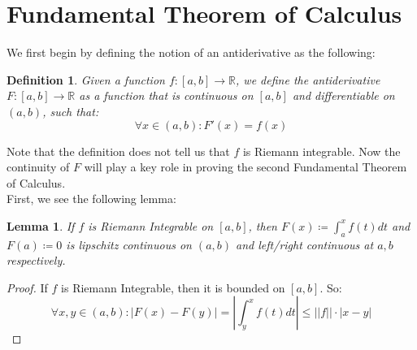 \documentclass[10pt,letterpaper]{article} %
\newtheorem{lem}{Lemma}[section]
\newtheorem{defn}{Definition}[section]
\begin{document}
\pagebreak
\section{Fundamental Theorem of Calculus}
We first begin by defining the notion of an antiderivative as the following:
\begin{defn}
Given a function $f: [a, b] \xrightarrow{} \mathbb{R}$, we define the antiderivative $F: [a, b] \xrightarrow{} \mathbb{R}$ as a function that is continuous on $[a, b]$ and differentiable on $(a, b)$, such that:
\begin{equation*}
  \forall x \in (a, b): F'(x) = f(x)
\end{equation*}
\end{defn}
Note that the definition does not tell us that $f$ is Riemann integrable. Now the continuity of $F$ will play a key role in proving the second Fundamental Theorem of Calculus.\\

First, we see the following lemma:
\begin{lem}
If $f$ is Riemann Integrable on $[a, b]$, then $F(x) \coloneq \int_{a}^{x} f(t) dt$ and $F(a) \coloneq 0$ is lipschitz continuous on $(a, b)$ and left/right continuous at $a, b$ respectively.
\end{lem}
\begin{proof}
If $f$ is Riemann Integrable, then it is bounded on $[a, b]$. So:
\begin{equation*}
  \forall x, y \in (a, b): |F(x) - F(y)| = \left|\int_{y}^{x}f(t)dt\right| \leqslant ||f|| \cdot |x - y|
\end{equation*}
\end{proof}
\end{document}
